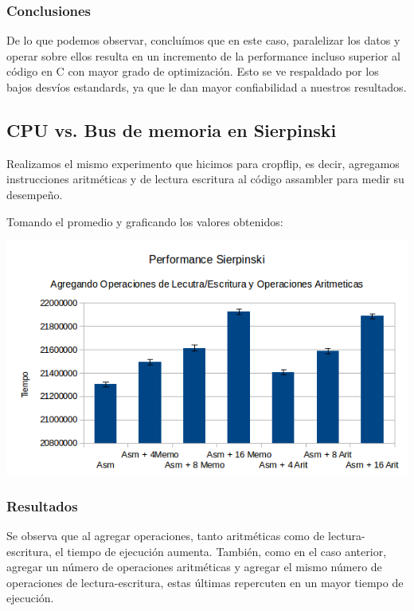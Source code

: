 \documentclass[a4paper]{article}
\begin{document}
\subsubsection{Conclusiones}

De lo que podemos observar, concluímos que en este caso, paralelizar los datos y operar sobre ellos resulta en un incremento de la performance incluso superior al código en C con mayor grado de optimización. Esto se ve respaldado por los bajos desvíos estandards, ya que le dan mayor confiabilidad a nuestros resultados.

\newpage
\subsection{CPU vs. Bus de memoria en Sierpinski}

Realizamos el mismo experimento que hicimos para cropflip, es decir, agregamos instrucciones aritméticas y de lectura escritura al código assambler para medir su desempeño.

Tomando el promedio y graficando los valores obtenidos:

  \begin{center}
  \includegraphics[scale=0.66]{Graficos1.5/sie/per.png}
  \end{center}

\subsubsection{Resultados}
Se observa que al agregar operaciones, tanto aritméticas como de lectura-escritura, el tiempo de ejecución aumenta. También, como en el caso anterior, agregar un número de operaciones aritméticas y agregar el mismo número de operaciones de lectura-escritura, estas últimas repercuten en un mayor tiempo de ejecución.
\end{document}
